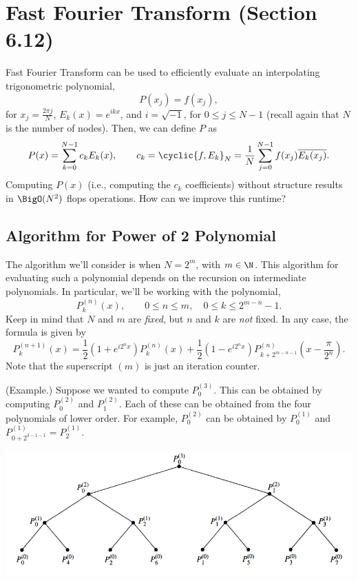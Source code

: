 \documentclass[letterpaper]{article}
\begin{document}
\section{Fast Fourier Transform (Section 6.12)}
Fast Fourier Transform can be used to efficiently evaluate an interpolating trigonometric polynomial, \[P(x_{j}) = f(x_{j}),\] for $x_{j} = \frac{2\pi j}{N}$, $E_{k}(x) = e^{ikx}$, and $i = \sqrt{-1}$, for $0 \leq j \leq N - 1$ (recall again that $N$ is the number of nodes). Then, we can define $P$ as 
\begin{equation}\label{lec20px}
    P(x) = \sum_{k = 0}^{N - 1} c_{k} E_{k}(x), \qquad c_{k} = \cyclic{f, E_{k}}_{N} = \frac{1}{N} \sum_{j = 0}^{N - 1} f(x_{j}) \overline{E_{k}(x_{j})}.
\end{equation}
Computing $P(x)$ (i.e., computing the $c_k$ coefficients) without structure results in $\BigO(N^2)$ flops operations. How can we improve this runtime? 

\subsection{Algorithm for Power of 2 Polynomial}
The algorithm we'll consider is when $N = 2^m$, with $m \in \N$. This algorithm for evaluating such a polynomial depends on the recursion on intermediate polynomials. In particular, we'll be working with the polynomial,
\[P_{k}^{(n)}(x), \qquad 0 \leq n \leq m, \quad 0 \leq k \leq 2^{m - n} - 1.\]
Keep in mind that $N$ and $m$ are \emph{fixed}, but $n$ and $k$ are \emph{not} fixed. In any case, the formula is given by 
\[P_{k}^{(n + 1)}(x) = \frac{1}{2}\left(1 + e^{i2^n x}\right) P_{k}^{(n)}(x) + \frac{1}{2}\left(1 - e^{i2^n x}\right)P_{k + 2^{m - n - 1}}^{(n)} \left(x - \frac{\pi}{2^n}\right).\]
Note that the superscript $(m)$ is just an iteration counter.

\begin{mdframed}
    (Example.) Suppose we wanted to compute $P_{0}^{(3)}$. This can be obtained by computing $P_{0}^{(2)}$ and $P_{1}^{(2)}$. Each of these can be obtained from the four polynomials of lower order. For example, $P_{0}^{(2)}$ can be obtained by $P_{0}^{(1)}$ and $P_{0 + 2^{3 - 1 - 1}}^{(1)} = P_{2}^{(1)}$. 
    
    \begin{center}
        \includegraphics[scale=0.7]{../assets/tree.png}
    \end{center}
\end{mdframed}
\end{document}
